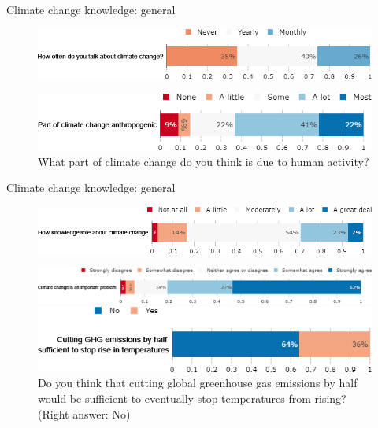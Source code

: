 \documentclass[aspectratio=169,9pt,dvipsnames]{beamer}
\begin{document}
\begin{frame}{Climate change knowledge: general}%
\begin{figure}[h!]
\centering
\caption{How often do you think or talk with people about climate change?}
\includegraphics[width=.7\textwidth]{../figures/DK/CC_talks_DK.png}\\
\centering
\caption{What part of climate change do you think is due to human activity?}
\includegraphics[width=.6\textwidth]{../figures/DK/CC_anthropogenic_DK.png}
\end{figure}
\end{frame}

\begin{frame}{Climate change knowledge: general}%
\begin{figure}[h!]
\centering
\caption{How knowledgeable do you consider yourself about climate change?}
\includegraphics[width=.8\textwidth]{../figures/DK/CC_knowledgeable_DK.png}
\\
\centering
\caption{Do you agree or disagree with the following statement: ``Climate change is an important problem."}
\includegraphics[width=.9\textwidth]{../figures/DK/CC_problem_DK.png}
\centering
\caption{Do you think that cutting global greenhouse gas emissions by half would be sufficient to eventually stop temperatures from rising? (Right answer: No)}
\includegraphics[width=.7\textwidth]{../figures/DK/CC_dynamic_DK.png}
\end{figure}
\end{frame}
\end{document}
